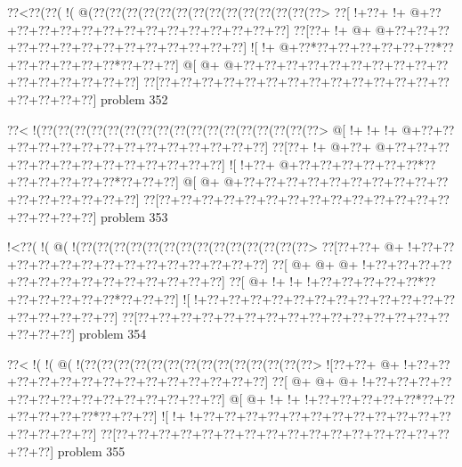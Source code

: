 \vbox{\vbox{\goo
\0??<\0??(\0??(\- !(\- @(\0??(\0??(\0??(\0??(\0??(\0??(\0??(\0??(\0??(\0??(\0??(\0??(\0??(\0??>
\0??[\- !+\0??+\- !+\- @+\0??+\0??+\0??+\0??+\0??+\0??+\0??+\0??+\0??+\0??+\0??+\0??+\0??+\0??]
\0??[\0??+\- !+\- @+\- @+\0??+\0??+\0??+\0??+\0??+\0??+\0??+\0??+\0??+\0??+\0??+\0??+\0??+\0??]
\- ![\- !+\- @+\0??*\0??+\0??+\0??+\0??+\0??+\0??*\0??+\0??+\0??+\0??+\0??+\0??*\0??+\0??+\0??]
\- @[\- @+\- @+\0??+\0??+\0??+\0??+\0??+\0??+\0??+\0??+\0??+\0??+\0??+\0??+\0??+\0??+\0??+\0??]
\0??[\0??+\0??+\0??+\0??+\0??+\0??+\0??+\0??+\0??+\0??+\0??+\0??+\0??+\0??+\0??+\0??+\0??+\0??]
}
\hfil problem 352\hfil\break
}



\vbox{\vbox{\goo
\0??<\- !(\0??(\0??(\0??(\0??(\0??(\0??(\0??(\0??(\0??(\0??(\0??(\0??(\0??(\0??(\0??(\0??(\0??>
\- @[\- !+\- !+\- !+\- @+\0??+\0??+\0??+\0??+\0??+\0??+\0??+\0??+\0??+\0??+\0??+\0??+\0??+\0??]
\0??[\0??+\- !+\- @+\0??+\- @+\0??+\0??+\0??+\0??+\0??+\0??+\0??+\0??+\0??+\0??+\0??+\0??+\0??]
\- ![\- !+\0??+\- @+\0??+\0??+\0??+\0??+\0??+\0??*\0??+\0??+\0??+\0??+\0??+\0??*\0??+\0??+\0??]
\- @[\- @+\- @+\0??+\0??+\0??+\0??+\0??+\0??+\0??+\0??+\0??+\0??+\0??+\0??+\0??+\0??+\0??+\0??]
\0??[\0??+\0??+\0??+\0??+\0??+\0??+\0??+\0??+\0??+\0??+\0??+\0??+\0??+\0??+\0??+\0??+\0??+\0??]
}
\hfil problem 353\hfil\break
}



\vbox{\vbox{\goo
\- !<\0??(\- !(\- @(\- !(\0??(\0??(\0??(\0??(\0??(\0??(\0??(\0??(\0??(\0??(\0??(\0??(\0??(\0??>
\0??[\0??+\0??+\- @+\- !+\0??+\0??+\0??+\0??+\0??+\0??+\0??+\0??+\0??+\0??+\0??+\0??+\0??+\0??]
\0??[\- @+\- @+\- @+\- !+\0??+\0??+\0??+\0??+\0??+\0??+\0??+\0??+\0??+\0??+\0??+\0??+\0??+\0??]
\0??[\- @+\- !+\- !+\- !+\0??+\0??+\0??+\0??+\0??*\0??+\0??+\0??+\0??+\0??+\0??*\0??+\0??+\0??]
\- ![\- !+\0??+\0??+\0??+\0??+\0??+\0??+\0??+\0??+\0??+\0??+\0??+\0??+\0??+\0??+\0??+\0??+\0??]
\0??[\0??+\0??+\0??+\0??+\0??+\0??+\0??+\0??+\0??+\0??+\0??+\0??+\0??+\0??+\0??+\0??+\0??+\0??]
}
\hfil problem 354\hfil\break
}



\vbox{\vbox{\goo
\0??<\- !(\- !(\- @(\- !(\0??(\0??(\0??(\0??(\0??(\0??(\0??(\0??(\0??(\0??(\0??(\0??(\0??(\0??>
\- ![\0??+\0??+\- @+\- !+\0??+\0??+\0??+\0??+\0??+\0??+\0??+\0??+\0??+\0??+\0??+\0??+\0??+\0??]
\0??[\- @+\- @+\- @+\- !+\0??+\0??+\0??+\0??+\0??+\0??+\0??+\0??+\0??+\0??+\0??+\0??+\0??+\0??]
\- @[\- @+\- !+\- !+\- !+\0??+\0??+\0??+\0??+\0??*\0??+\0??+\0??+\0??+\0??+\0??*\0??+\0??+\0??]
\- ![\- !+\- !+\0??+\0??+\0??+\0??+\0??+\0??+\0??+\0??+\0??+\0??+\0??+\0??+\0??+\0??+\0??+\0??]
\0??[\0??+\0??+\0??+\0??+\0??+\0??+\0??+\0??+\0??+\0??+\0??+\0??+\0??+\0??+\0??+\0??+\0??+\0??]
}
\hfil problem 355\hfil\break
}



